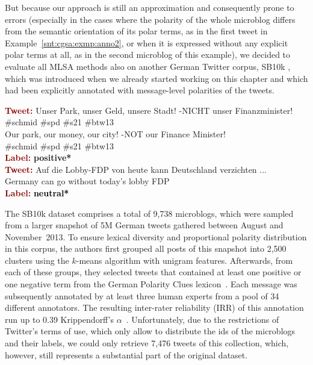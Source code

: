But because our approach is still an approximation and consequently
prone to errors (especially in the cases where the polarity of the
whole microblog differs from the semantic orientation of its polar
terms, as in the first tweet in Example~\ref{snt:cgsa:exmp:anno2}, or
when it is expressed without any explicit polar terms at all, as in
the second microblog of this example), we decided to evaluate all MLSA
methods also on another German Twitter corpus, SB10k
\cite{Cieliebak:17}, which was introduced when we already started
working on this chapter and which had been explicitly annotated with
message-level polarities of the tweets.

\begin{example}\label{snt:cgsa:exmp:anno2}
  \noindent\textup{\bfseries\textcolor{darkred}{Tweet:}} {\upshape
    Unser Park, unser Geld, unsere Stadt! -NICHT unser Finanzminister!
    \emoexpression[polarity=positive]{\smiley{}} \#schmid \#spd \#s21
    \#btw13}\\
  \noindent Our park, our money, our city! -NOT our Finance Minister!\\
  \emoexpression[polarity=positive]{\smiley{}} \#schmid \#spd \#s21
  \#btw13\\
  \noindent\textup{\bfseries\textcolor{darkred}{Label:}}\hspace*{2em}\textbf{%
    \upshape\textcolor{green3}{positive*}}\\[1.5em]
  \noindent\textup{\bfseries\textcolor{darkred}{Tweet:}} {\upshape Auf die Lobby-FDP von heute kann Deutschland verzichten ...}\\
  \noindent Germany can go without today's lobby FDP\\
  \noindent\textup{\bfseries\textcolor{darkred}{Label:}}\hspace*{2em}\textbf{%
    \upshape\textcolor{black}{neutral*}}
\end{example}

The SB10k dataset comprises a total of 9,738 microblogs, which were
sampled from a larger snapshot of 5M German tweets gathered between
August and November~2013.  To ensure lexical diversity and
proportional polarity distribution in this corpus, the authors first
grouped all posts of this snapshot into 2,500 clusters using the
$k$-means algorithm with unigram features.  Afterwards, from each of
these groups, they selected tweets that contained at least one
positive or one negative term from the German Polarity Clues
lexicon~\cite{Waltinger:10}.  Each message was subsequently annotated
by at least three human experts from a pool of 34 different
annotators.  The resulting inter-rater reliability (IRR) of this
annotation run up to 0.39 Krippendorff's
$\alpha$~\cite{Krippendorff:07}.  Unfortunately, due to the
restrictions of Twitter's terms of use, which only allow to distribute
the ids of the microblogs and their labels, we could only retrieve
7,476 tweets of this collection, which, however, still represents a
substantial part of the original dataset.

